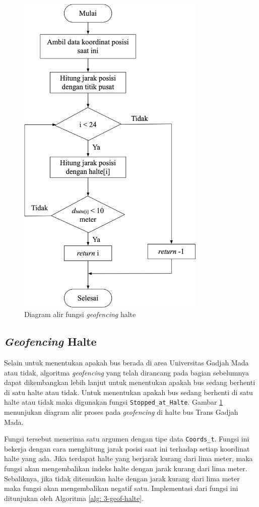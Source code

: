 \begin{figure}[H]
	\centering
	\includegraphics[width=9cm]{contents/chapter-3/flowchart-geofencing-halte.png}
	\caption{Diagram alir fungsi \textit{geofencing} halte}
	\label{Fig: flowchart-geofencing-halte}
\end{figure}

\subsection{\textit{Geofencing} Halte}
Selain untuk menentukan apakah bus berada di area Universitas Gadjah Mada atau tidak, algoritma \textit{geofencing} yang telah dirancang pada bagian sebelumnya dapat dikembangkan lebih lanjut untuk menentukan apakah bus sedang berhenti di satu halte atau tidak. Untuk menentukan apakah bus sedang berhenti di satu halte atau tidak maka digunakan fungsi \texttt{Stopped\_at\_Halte}. Gambar \ref{Fig: flowchart-geofencing-halte} menunjukan diagram alir proses pada \textit{geofencing} di halte bus Trans Gadjah Mada. 

Fungsi tersebut menerima satu argumen dengan tipe data \texttt{Coords\_t}. Fungsi ini bekerja dengan cara menghitung jarak posisi saat ini terhadap setiap koordinat halte yang ada. Jika terdapat halte yang berjarak kurang dari lima meter, maka fungsi akan mengembalikan indeks halte dengan jarak kurang dari lima meter. Sebaliknya, jika tidak ditemukan halte dengan jarak kurang dari lima meter maka fungsi akan mengembalikan negatif satu. Implementasi dari fungsi ini ditunjukan oleh Algoritma \ref{alg: 3-geof-halte}.


